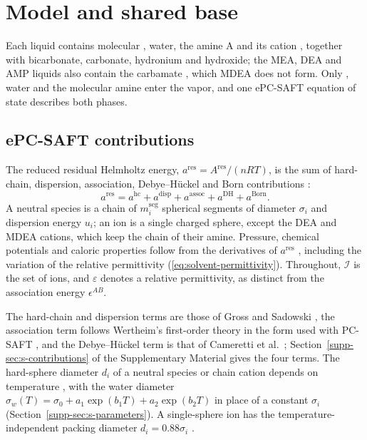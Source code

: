 \section{Model and shared base}\label{sec:theory}
Each liquid contains molecular \COtwo, water, the amine A and its cation , together with bicarbonate, carbonate, hydronium and hydroxide; the MEA, DEA and AMP liquids also contain the carbamate , which MDEA does not form.
Only \COtwo, water and the molecular amine enter the vapor, and one ePC-SAFT equation of state describes both phases.

\subsection{ePC-SAFT contributions}\label{sec:contributions}
The reduced residual Helmholtz energy, $a^{\mathrm{res}}=A^{\mathrm{res}}/(nRT)$, is the sum of hard-chain, dispersion, association, Debye--H\"uckel and Born contributions \cite{Gross2001,Gross2002,Cameretti2005,Held2014,Figiel2025}:
\begin{equation}
    a^{\mathrm{res}}
    =
    a^{\mathrm{hc}}
    +a^{\mathrm{disp}}
    +a^{\mathrm{assoc}}
    +a^{\mathrm{DH}}
    +a^{\mathrm{Born}} .
    \label{eq:epcsaft-residual-split}
\end{equation}
A neutral species is a chain of $m_i^{\mathrm{seg}}$ spherical segments of diameter $\sigma_i$ and dispersion energy $u_i$; an ion is a single charged sphere, except the DEA and MDEA cations, which keep the chain of their amine.
Pressure, chemical potentials and caloric properties follow from the derivatives of $a^{\mathrm{res}}$ \cite{Gross2001}, including the variation of the relative permittivity (\cref{eq:solvent-permittivity}).
Throughout, $\mathcal I$ is the set of ions, and $\varepsilon$ denotes a relative permittivity, as distinct from the association energy $\epsilon^{AB}$.

The hard-chain and dispersion terms are those of Gross and Sadowski \cite{Gross2001}, the association term follows Wertheim's first-order theory in the form used with PC-SAFT \cite{Kleiner2007}, and the Debye--H\"uckel term is that of Cameretti et al.\ \cite{Cameretti2005}; Section~\ref{supp-sec:s-contributions} of the Supplementary Material gives the four terms.
The hard-sphere diameter $d_i$ of a neutral species or chain cation depends on temperature \cite{Gross2001}, with the water diameter $\sigma_w(T)=\sigma_0+a_1\exp(b_1T)+a_2\exp(b_2T)$ in place of a constant $\sigma_i$ (Section~\ref{supp-sec:s-parameters}).
A single-sphere ion has the temperature-independent packing diameter $d_i=0.88\sigma_i$ \cite{Held2014}.

